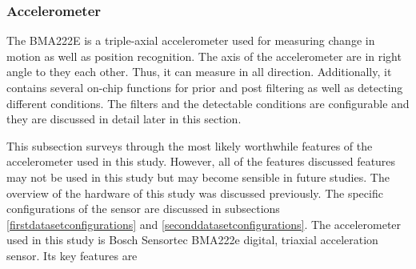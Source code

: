 \documentclass[english,12pt,a4paper,pdftex,elec,utf8]{aaltothesis}
\begin{document}
\subsubsection*{Accelerometer}

The BMA222E is a triple-axial accelerometer used for measuring change in motion as well as position recognition. The axis of the accelerometer are in right angle to they each other. Thus, it can measure in all direction. Additionally, it contains several on-chip functions for prior and post filtering as well as detecting different conditions. The filters and the detectable conditions are configurable and they are discussed in detail later in this section.


This subsection surveys through the most likely worthwhile features of the accelerometer used in this study. However, all of the features discussed features may not be used in this study but may become sensible in future studies. The overview of the hardware of this study was discussed previously. The specific configurations of the sensor are discussed in subsections \ref{firstdatasetconfigurations} and \ref{seconddatasetconfigurations}. The accelerometer used in this study is Bosch Sensortec BMA222e digital, triaxial acceleration sensor. Its key features are 
\end{document}
